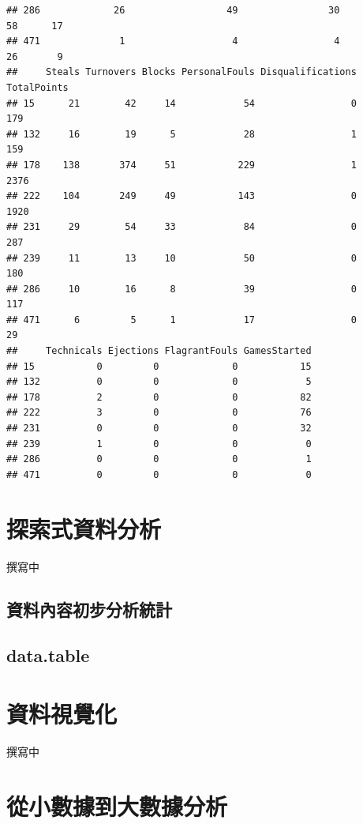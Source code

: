 \documentclass[]{book}
\theoremstyle{definition}
\theoremstyle{definition}
\theoremstyle{remark}
\begin{document}
\begin{verbatim}
## 286             26                  49                30            58      17
## 471              1                   4                 4            26       9
##     Steals Turnovers Blocks PersonalFouls Disqualifications TotalPoints
## 15      21        42     14            54                 0         179
## 132     16        19      5            28                 1         159
## 178    138       374     51           229                 1        2376
## 222    104       249     49           143                 0        1920
## 231     29        54     33            84                 0         287
## 239     11        13     10            50                 0         180
## 286     10        16      8            39                 0         117
## 471      6         5      1            17                 0          29
##     Technicals Ejections FlagrantFouls GamesStarted
## 15           0         0             0           15
## 132          0         0             0            5
## 178          2         0             0           82
## 222          3         0             0           76
## 231          0         0             0           32
## 239          1         0             0            0
## 286          0         0             0            1
## 471          0         0             0            0
\end{verbatim}

\chapter{探索式資料分析}\label{eda}

撰寫中

\section{資料內容初步分析統計}

\section{data.table}\label{data.table}

\chapter{資料視覺化}\label{vis}

撰寫中

\chapter{從小數據到大數據分析}\label{big}
\end{document}
